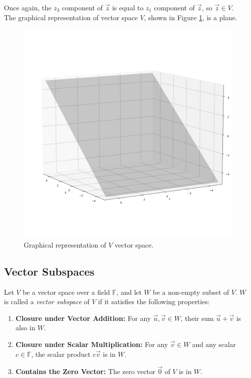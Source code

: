 Once again, the $z_3$ component of $\vec z$ is equal to $z_1$ component of $\vec z$, so $\vec z \in V$.
\\

The graphical representation of vector space $V$, shown in Figure \ref{fig:vector-space-ex}, is a plane.

\begin{figure}[h]
    \centering
    \includegraphics[scale=0.39]{Images/vector-space-ex.png}
    \caption{Graphical representation of $V$ vector space.}
    \label{fig:vector-space-ex}
\end{figure}
\subsection{Vector Subspaces}

Let $V$ be a vector space over a field $\mathbb{F}$, and let $W$ be a non-empty subset of $V$. $W$ is called a \emph{vector subspace} of $V$ if it satisfies the following properties:

\begin{enumerate}
    \item \textbf{Closure under Vector Addition:} For any $\vec{u}, \vec{v} \in W$, their sum $\vec{u} + \vec{v}$ is also in $W$.
    
    \item \textbf{Closure under Scalar Multiplication:} For any $\vec{v} \in W$ and any scalar $c \in \mathbb{F}$, the scalar product $c\vec{v}$ is in $W$.
    
    \item \textbf{Contains the Zero Vector:} The zero vector $\vec{0}$ of $V$ is in $W$.
\end{enumerate}

